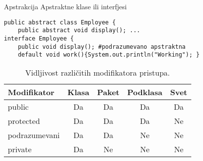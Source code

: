 \documentclass[14pt,aspectratio=169]{beamer}
\begin{document}
\begin{frame}[fragile]{Apstrakcija}
Apstraktne klase ili interfjesi
\begin{lstlisting}
public abstract class Employee {
	public abstract void display(); ...
interface Employee {
	public void display(); #podrazumevano apstraktna
	default void work(){System.out.println("Working"); }
\end{lstlisting}
\begin{table}
\begin{center}
\caption{Vidljivost različitih modifikatora pristupa.}
\begin{tabular}{|l|c|c|c|c|} \hline
Modifikator &Klasa &Paket &Podklasa &Svet\\ \hline
public &Da &Da &Da &Da\\ \hline
protected &Da &Da &Da &Ne\\ \hline
podrazumevani &Da &Da &Ne &Ne\\ \hline
private &Da &Ne &Ne &Ne\\ \hline
\end{tabular}
\label{tab:tabelaModPristupa}
\end{center}
\end{table}
\end{frame}
\end{document}
